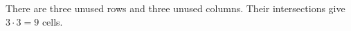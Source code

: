 There are three unused rows and three unused columns. Their intersections give $\boxed{3\cdot3=9}$ cells.
